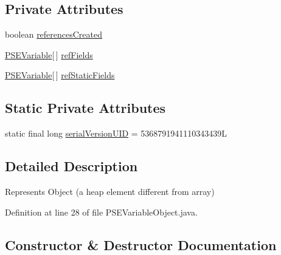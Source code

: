 \subsection*{Private Attributes}
\begin{DoxyCompactItemize}
\item 
boolean \hyperlink{classgov_1_1nasa_1_1jpf_1_1inspector_1_1common_1_1pse_1_1_p_s_e_variable_object_ac473322f8a0b42cfcf3abe2660d08012}{references\+Created}
\item 
\hyperlink{classgov_1_1nasa_1_1jpf_1_1inspector_1_1common_1_1pse_1_1_p_s_e_variable}{P\+S\+E\+Variable}\mbox{[}$\,$\mbox{]} \hyperlink{classgov_1_1nasa_1_1jpf_1_1inspector_1_1common_1_1pse_1_1_p_s_e_variable_object_aec754c02da23161f08577e11cc51e940}{ref\+Fields}
\item 
\hyperlink{classgov_1_1nasa_1_1jpf_1_1inspector_1_1common_1_1pse_1_1_p_s_e_variable}{P\+S\+E\+Variable}\mbox{[}$\,$\mbox{]} \hyperlink{classgov_1_1nasa_1_1jpf_1_1inspector_1_1common_1_1pse_1_1_p_s_e_variable_object_a9a9e3549b264f288ce0927209ab0f049}{ref\+Static\+Fields}
\end{DoxyCompactItemize}
\subsection*{Static Private Attributes}
\begin{DoxyCompactItemize}
\item 
static final long \hyperlink{classgov_1_1nasa_1_1jpf_1_1inspector_1_1common_1_1pse_1_1_p_s_e_variable_object_ae3574b2566d01837e783e2afe0469671}{serial\+Version\+U\+ID} = 5368791941110343439L
\end{DoxyCompactItemize}


\subsection{Detailed Description}
Represents Object (a heap element different from array) 

Definition at line 28 of file P\+S\+E\+Variable\+Object.\+java.



\subsection{Constructor \& Destructor Documentation}

